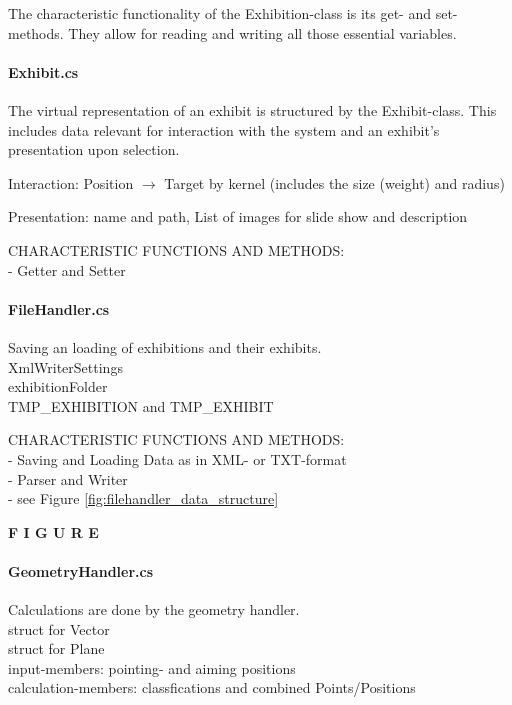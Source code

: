 The characteristic functionality of the Exhibition-class is its get- and set-methods. They allow for reading and writing all those essential variables.


\paragraph{Exhibit.cs} The virtual representation of an exhibit is structured by the Exhibit-class. This includes data relevant for interaction with the system and an exhibit's presentation upon selection.

Interaction: Position $\to$ Target by kernel (includes the size (weight) and radius)

Presentation: name and path, List of images for slide show and description

CHARACTERISTIC FUNCTIONS AND METHODS:
\\- Getter and Setter


\paragraph{FileHandler.cs} Saving an loading of exhibitions and their exhibits.
\\
XmlWriterSettings
\\
exhibitionFolder
\\
TMP\_EXHIBITION and TMP\_EXHIBIT 

CHARACTERISTIC FUNCTIONS AND METHODS:
\\- Saving and Loading Data as in XML- or TXT-format
\\- Parser and Writer
\\- see Figure \ref{fig:filehandler_data_structure}

\textbf{F I G U R E}


\paragraph{GeometryHandler.cs} Calculations are done by the geometry handler.
\\
struct for Vector
\\
struct for Plane
\\
input-members: pointing- and aiming positions
\\
calculation-members: classfications and combined Points/Positions

